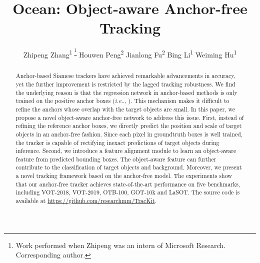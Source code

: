 \documentclass[runningheads]{llncs}
\makeatletter
\DeclareRobustCommand\onedot{\futurelet\@let@token\@onedot}
\def\@onedot{\ifx\@let@token.\else.\null\fi\xspace}
\def\ie{\emph{i.e}\onedot} \def\Ie{\emph{I.e}\onedot}
\makeatother
\begin{document}
\pagestyle{headings}
\mainmatter
\def\ECCVSubNumber{3872}  

\title{Ocean: Object-aware Anchor-free Tracking} 

\begin{comment}
\titlerunning{ECCV-20 submission ID \ECCVSubNumber} 
\authorrunning{ECCV-20 submission ID \ECCVSubNumber} 
\author{Anonymous ECCV submission}
\institute{Paper ID \ECCVSubNumber}
\end{comment}










\author{
	Zhipeng Zhang\textsuperscript{1 \thanks{\scriptsize Work performed when Zhipeng was an intern of Microsoft Research.  Corresponding author.}} 
	Houwen Peng\textsuperscript{2  }
	Jianlong Fu\textsuperscript{2}
Bing Li\textsuperscript{1} 
	Weiming Hu\textsuperscript{1}  
	}


\authorrunning{ }




\maketitle






\begin{abstract}
Anchor-based Siamese trackers have achieved  remarkable advancements in accuracy, yet the further improvement is restricted by the lagged tracking robustness. We find the underlying reason is that the regression network in anchor-based methods is only trained on the positive anchor boxes (\ie, \emph{}). This mechanism makes it difficult to refine the anchors whose overlap with the target objects are small. In this paper, we propose a novel object-aware anchor-free network to address this issue. First, instead of refining the reference anchor boxes, we directly predict the position and scale of target objects in an anchor-free fashion. Since each pixel in groundtruth boxes is well trained, the tracker is capable of rectifying inexact predictions of target objects during inference. Second, we introduce a feature alignment module to learn an object-aware feature from predicted bounding boxes. The object-aware feature can further contribute to the classification of target objects and background. Moreover, we present a novel tracking framework based on the anchor-free model. The experiments show that our anchor-free tracker achieves state-of-the-art performance on five benchmarks, including VOT-2018, VOT-2019, OTB-100, GOT-10k and LaSOT. The source code is available at \url{https://github.com/researchmm/TracKit}.

\end{abstract}
\end{document}
